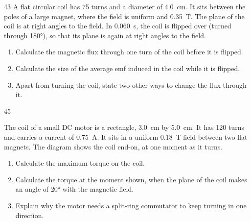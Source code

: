 \begin{practiceq}{4}{3}\label{pq:flip}
A flat circular coil has 75 turns and a diameter of \qty{4.0}{cm}. It sits between the poles
of a large magnet, where the field is uniform and \qty{0.35}{T}. The plane of the coil is at
right angles to the field. In \qty{0.060}{s}, the coil is flipped over (turned through
\ang{180}), so that its plane is again at right angles to the field.
\begin{enumerate}[label=(\alph*)]
  \item Calculate the magnetic flux through one turn of the coil before it is flipped.
  \item Calculate the size of the average emf induced in the coil while it is flipped.
  \item Apart from turning the coil, state two other ways to change the flux through it.
\end{enumerate}
\end{practiceq}

\begin{practiceq}{4}{5}\label{pq:torque}
\begin{sidebyside}[0.42]
  \centering
\nextside
The coil of a small DC motor is a rectangle, \qty{3.0}{cm} by \qty{5.0}{cm}. It has 120
turns and carries a current of \qty{0.75}{A}. It sits in a uniform \qty{0.18}{T} field
between two flat magnets. The diagram shows the coil end-on, at one moment as it turns.
\end{sidebyside}
\begin{enumerate}[label=(\alph*)]
  \item Calculate the maximum torque on the coil. 
  \item Calculate the torque at the moment shown, when the plane of the coil makes an angle
        of \ang{20} with the magnetic field. 
  \item Explain why the motor needs a split-ring commutator to keep turning in one direction.
\end{enumerate}
\end{practiceq}

